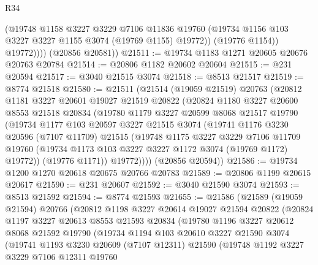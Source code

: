 \begin{lexlean}{R34}
\begin{coremodule}
                (@19748
                  @1158
                  @3227
                  @3229
                  @7106
                  @11836
                  @19760
                  (@19734 @1156 @103 @3227 @3227 @1155 @3074 (@19769 @1155) @19772))
                (@19776 @1154))
              @19772))))
      (@20856 @20581))
@21511 := @19734 @1183 @1271 @20605 @20676 @20763 @20784
@21514 := @20806 @1182 @20602 @20604
@21515 := @231 @20594
@21517 := @3040 @21515 @3074
@21518 := @8513 @21517
@21519 := @8774 @21518
@21580 := @21511
    (@21514
      (@19059 @21519)
      @20763
      (@20812
        @1181
        @3227
        @20601
        @19027
        @21519
        @20822
        (@20824
          @1180
          @3227
          @20600
          @8553
          @21518
          @20834
          (@19780
            @1179
            @3227
            @20599
            @8068
            @21517
            @19790
            (@19734
              @1177
              @103
              @20597
              @3227
              @21515
              @3074
              (@19741
                @1176
                @3230
                @20596
                (@7107 @11709)
                @21515
                (@19748
                  @1175
                  @3227
                  @3229
                  @7106
                  @11709
                  @19760
                  (@19734 @1173 @103 @3227 @3227 @1172 @3074 (@19769 @1172) @19772))
                (@19776 @1171))
              @19772))))
      (@20856 @20594))
@21586 := @19734 @1200 @1270 @20618 @20675 @20766 @20783
@21589 := @20806 @1199 @20615 @20617
@21590 := @231 @20607
@21592 := @3040 @21590 @3074
@21593 := @8513 @21592
@21594 := @8774 @21593
@21655 := @21586
    (@21589
      (@19059 @21594)
      @20766
      (@20812
        @1198
        @3227
        @20614
        @19027
        @21594
        @20822
        (@20824
          @1197
          @3227
          @20613
          @8553
          @21593
          @20834
          (@19780
            @1196
            @3227
            @20612
            @8068
            @21592
            @19790
            (@19734
              @1194
              @103
              @20610
              @3227
              @21590
              @3074
              (@19741
                @1193
                @3230
                @20609
                (@7107 @12311)
                @21590
                (@19748
                  @1192
                  @3227
                  @3229
                  @7106
                  @12311
                  @19760

\end{coremodule}
\end{lexlean}
